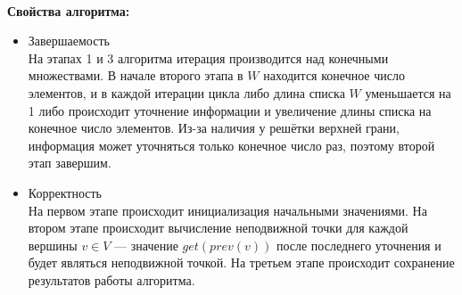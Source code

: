 ~\\
\textbf{Свойства алгоритма:}
\begin{itemize}
    \item Завершаемость\\
      На этапах 1 и 3 алгоритма итерация производится над конечными
      множествами. В начале второго этапа в $W$ находится конечное
      число элементов, и в каждой итерации цикла либо длина списка $W$ 
      уменьшается на 1 либо происходит уточнение информации
      и увеличение длины списка на конечное число элементов. Из-за
      наличия у решётки верхней грани, информация может уточняться
      только конечное число раз, поэтому второй этап завершим.
    \item Корректность\\
      На первом этапе происходит инициализация начальными значениями.
      На втором этапе происходит вычисление неподвижной точки для
      каждой вершины $v \in V$ --- значение $get(prev(v))$ после
      последнего уточнения и будет являться неподвижной точкой.
      На третьем этапе происходит сохранение результатов работы 
      алгоритма.
\end{itemize}
